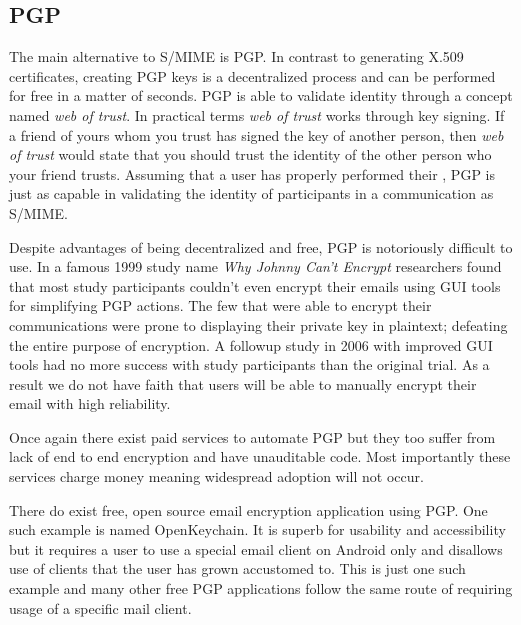 \documentclass[11pt]{article}
\begin{document}
\subsection{PGP}
\par The main alternative to S/MIME is PGP. In contrast to generating X.509 certificates, creating PGP keys is a decentralized process and can be performed for free in a matter of seconds. PGP is able to validate identity through a concept named \textit{web of trust}. In practical terms \textit{web of trust} works through key signing. If a friend of yours whom you trust has signed the key of another person, then \textit{web of trust} would state that you should trust the identity of the other person who your friend trusts\cite{zimmermann1995official}. Assuming that a user has properly performed their , PGP is just as capable in validating the identity of participants in a communication as S/MIME\cite{furnell2013usable}.
\par Despite advantages of being decentralized and free, PGP is notoriously difficult to use. In a famous 1999 study name \textit{Why Johnny Can't Encrypt} researchers found that most study participants couldn't even encrypt their emails using GUI tools for simplifying PGP actions. The few that were able to encrypt their communications were prone to displaying their private key in plaintext; defeating the entire purpose of encryption\cite{whitten1999johnny}. A followup study in 2006 with improved GUI tools had no more success with study participants than the original trial\cite{sheng2006johnny}. As a result we do not have faith that users will be able to manually encrypt their email with high reliability.
\par Once again there exist paid services to automate PGP but they too suffer from lack of end to end encryption and have unauditable code\cite{ciphermail-gateway,hushmail,eff-scorecard}. Most importantly these services charge money meaning widespread adoption will not occur.
\par There do exist free, open source email encryption application using PGP. One such example is named OpenKeychain. It is superb for usability and accessibility but it requires a user to use a special email client on Android only and disallows use of clients that the user has grown accustomed to\cite{openkeychain}. This is just one such example and many other free PGP applications follow the same route of requiring usage of a specific mail client.
\end{document}
